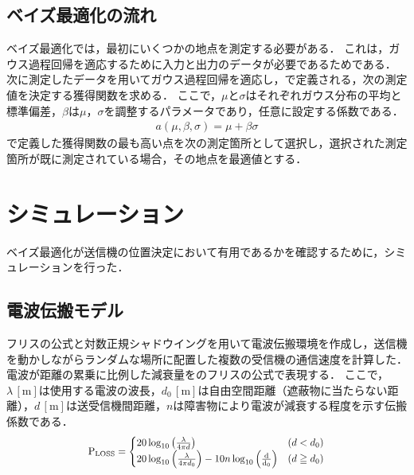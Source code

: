 \documentclass[twocolumn]{ltjarticle}
\begin{document}
\subsection{ベイズ最適化の流れ}

ベイズ最適化では，最初にいくつかの地点を測定する必要がある．
これは，ガウス過程回帰を適応するために入力と出力のデータが必要であるためである．
次に測定したデータを用いてガウス過程回帰を適応し，で定義される，次の測定値を決定する獲得関数を求める．
ここで，\(\mu\)と\(\sigma\)はそれぞれガウス分布の平均と標準偏差，\(\beta\)は\(\mu\)，\(\sigma\)を調整するパラメータであり，任意に設定する係数である．
\begin{align}
	a(\mu, \beta, \sigma) = \mu + \beta \sigma \label{eq:acquisition}
\end{align}
で定義した獲得関数の最も高い点を次の測定箇所として選択し，選択された測定箇所が既に測定されている場合，その地点を最適値とする．
\section{シミュレーション}

ベイズ最適化が送信機の位置決定において有用であるかを確認するために，シミュレーションを行った．
\subsection{電波伝搬モデル}

フリスの公式と対数正規シャドウイングを用いて電波伝搬環境を作成し，送信機を動かしながらランダムな場所に配置した複数の受信機の通信速度を計算した．
電波が距離の累乗に比例した減衰量をのフリスの公式で表現する．
ここで，\(\lambda\,\mathrm{[m]}\)は使用する電波の波長，\(d_0\,\mathrm{[m]}\)は自由空間距離（遮蔽物に当たらない距離），\(d\,\mathrm{[m]}\)は送受信機間距離，\(n\)は障害物により電波が減衰する程度を示す伝搬係数である．
\begin{align}
	\scalebox{0.9}{
		\(
		\mathrm{P_{LOSS}} =
		\begin{cases}
			20 \log_{10} \left( \frac{\lambda}{4 \pi d} \right)                                                         & (d < d_0)     \\
			20 \log_{10} \left( \frac{\lambda}{4 \pi d_0} \right) - 10n \log_{10} \left( \mathrm{\frac{d}{d_0}} \right) & (d \geqq d_0)
		\end{cases} \label{eq:friss}
		\)
	}
\end{align}
\end{document}
